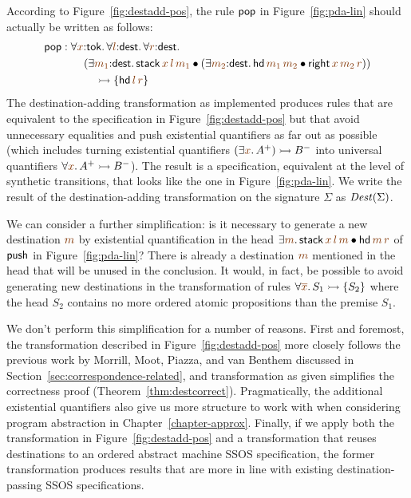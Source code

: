 According to Figure~\ref{fig:destadd-pos}, the rule 
${\sf pop}$ in Figure~\ref{fig:pda-lin} should actually be written as
follows:
\begin{align*} 
  {\sf pop} & : 
  \forall \lf x{:}{\sf tok}.\,
  \forall \lf l{:}{\sf dest}.\,
  \forall \lf r{:}{\sf dest}.\,
  \\
  & \qquad (\exists \lf{m_1}{:}{\sf dest}.\, {\sf stack}\,\lf{x}\,\lf{l}\,\lf{m_1} \fuse
   (\exists \lf{m_2}{:}{\sf dest}.\, {\sf hd}\,\lf{m_1}\,\lf{m_2} \fuse
     {\sf right}\,\lf{x}\,\lf{m_2}\,\lf{r}))
  \\ 
  & \qquad\quad \lefti
  \{ 
    {\sf hd}\,\lf{l}\,\lf{r}
  \}
\end{align*}
The destination-adding transformation as
implemented produces rules that are
equivalent to the specification in Figure~\ref{fig:destadd-pos} but
that avoid unnecessary equalities and push existential quantifiers as
far out as possible (which includes turning existential quantifiers
$(\exists \lf x.\,A^+) \lefti B^-$ into universal quantifiers $\forall
\lf x.\,A^+ \lefti B^-$). The result is a specification, equivalent
at the level of synthetic transitions, that looks like the one in
Figure~\ref{fig:pda-lin}. We write the result of the
destination-adding transformation on the signature $\Sigma$ as ${\it
  Dest}(\Sigma)$.

We can consider a further simplification: is it necessary to generate
a new destination $\lf{m}$ by existential quantification in the head
$\exists \lf{m}.\,{\sf stack}\,\lf{x}\,\lf{l}\,\lf{m} \fuse {\sf hd}\,\lf{m}\,\lf{r}$ of ${\sf
  push}$ in Figure~\ref{fig:pda-lin}? There is already a destination
$\lf m$ mentioned in the head that will be unused in the conclusion.  It
would, in fact, be possible to avoid generating new destinations in
the transformation of rules $\forall \lf{\overline{x}}.\,S_1 \lefti \{ S_2
\}$ where the head $S_2$ contains no more ordered atomic propositions
than the premise $S_1$. 

We don't perform this simplification for a number of reasons. First
and foremost, the transformation described in
Figure~\ref{fig:destadd-pos} more closely follows the previous work by
Morrill, Moot, Piazza, and van Benthem discussed in
Section~\ref{sec:correspondence-related}, and transformation as given
simplifies the correctness proof (Theorem~\ref{thm:destcorrect}).
Pragmatically, the additional existential quantifiers also give us
more structure to work with when considering program abstraction in
Chapter~\ref{chapter-approx}. Finally, if we apply both the transformation in
Figure~\ref{fig:destadd-pos} and a transformation that reuses
destinations to an ordered abstract machine SSOS specification, the
former transformation produces results that are more in line with
existing destination-passing SSOS specifications.

